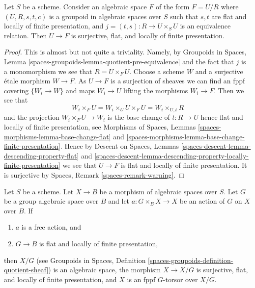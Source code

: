 \begin{lemma}
\label{lemma-covering-quotient}
Let $S$ be a scheme. Consider an algebraic space $F$ of the form $F = U/R$
where $(U, R, s, t, c)$ is a groupoid in algebraic spaces
over $S$ such that $s, t$ are flat and locally of finite presentation, and
$j = (t, s) : R \to U \times_S U$ is an equivalence relation.
Then $U \to F$ is surjective, flat, and locally of finite presentation.
\end{lemma}

\begin{proof}
This is almost but not quite a triviality. Namely, by
Groupoids in Spaces, Lemma
\ref{spaces-groupoids-lemma-quotient-pre-equivalence}
and the fact that $j$ is a monomorphism we see that $R = U \times_F U$.
Choose a scheme $W$ and a surjective \'etale morphism $W \to F$.
As $U \to F$ is a surjection of sheaves we can find an fppf covering
$\{W_i \to W\}$ and maps $W_i \to U$ lifting the morphisms $W_i \to F$.
Then we see that
$$
W_i \times_F U = W_i \times_U U \times_F U = W_i \times_{U, t} R
$$
and the projection $W_i \times_F U \to W_i$ is the base change of
$t : R \to U$ hence flat and locally of finite presentation, see
Morphisms of Spaces, Lemmas
\ref{spaces-morphisms-lemma-base-change-flat} and
\ref{spaces-morphisms-lemma-base-change-finite-presentation}.
Hence by
Descent on Spaces, Lemmas
\ref{spaces-descent-lemma-descending-property-flat} and
\ref{spaces-descent-lemma-descending-property-locally-finite-presentation}
we see that $U \to F$ is flat and locally of finite presentation.
It is surjective by
Spaces, Remark \ref{spaces-remark-warning}.
\end{proof}

\begin{lemma}
\label{lemma-quotient-free-action}
Let $S$ be a scheme. Let $X \to B$ be a morphism of algebraic spaces over
$S$. Let $G$ be a group algebraic space over $B$ and let
$a : G \times_B X \to X$ be an action of $G$ on $X$ over $B$.
If
\begin{enumerate}
\item $a$ is a free action, and
\item $G \to B$ is flat and locally of finite presentation,
\end{enumerate}
then $X/G$ (see
Groupoids in Spaces, Definition
\ref{spaces-groupoids-definition-quotient-sheaf})
is an algebraic space, the morphism $X \to X/G$ is
surjective, flat, and locally of finite presentation, and
$X$ is an fppf $G$-torsor over $X/G$.
\end{lemma}

